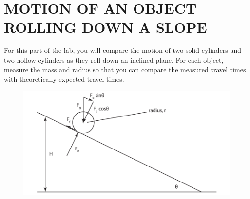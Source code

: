 \documentclass[11pt,letterpaper]{article}
\begin{document}
\section{MOTION OF AN OBJECT ROLLING DOWN A SLOPE}
For this part of the lab, you will compare the motion of two solid cylinders and two hollow cylinders as they roll down an inclined plane. For each object, measure the mass and radius so that you can compare the measured travel times with theoretically expected travel times. 



\begin{figure}[h]
\begin{center}
\includegraphics{./rolling_ball}
\end{center}
\end{figure}
\end{document}
